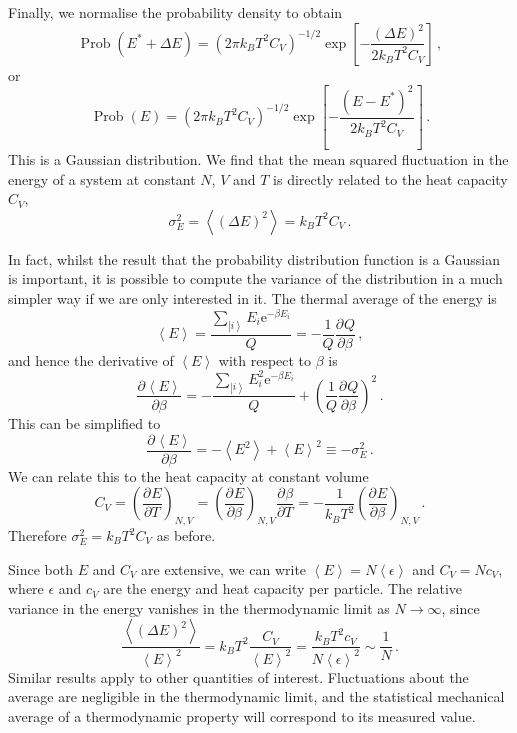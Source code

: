 \documentclass{article}
\theoremstyle{plain}\theoremheaderfont{\normalfont\bfseries}\theorembodyfont{\rmfamily}\theoremseparator{.}\newtheorem*{thm}{Theorem}\newtheorem*{law}{Law}\newtheorem*{pos}{Postulate}
\numberwithin{equation}{section}
\newcommand{\ee}{\mathrm{e}}
\newcommand{\pdv}[3][]{\frac{\partial^{#1} #2}{{\partial #3}^{#1}}}
\newcommand{\ket}[1]{\left| #1 \right\rangle}
\newcommand{\eval}[1]{\left\langle #1 \right\rangle}
\DeclareMathOperator{\Prob}{Prob}
\begin{document}
    Finally, we normalise the probability density to obtain
    \begin{equation}
        \Prob(E^*+\Delta E)=(2\pi k_B T^2 C_V)^{-1/2}\exp\left[-\frac{(\Delta E)^2}{2k_B T^2C_V}\right]\,,
    \end{equation}
    or
    \begin{equation}
        \Prob(E)=(2\pi k_B T^2 C_V)^{-1/2}\exp\left[-\frac{(E-E^*)^2}{2k_B T^2C_V}\right]\,.
    \end{equation}
    This is a Gaussian distribution. We find that the mean squared fluctuation in the energy of a system at constant \(N\), \(V\) and \(T\) is directly related to the heat capacity \(C_V\),
    \begin{equation}
        \sigma_E^2=\eval{(\Delta E)^2}=k_BT^2C_V\,.
    \end{equation}

    In fact, whilst the result that the probability distribution function is a Gaussian is important, it is possible to compute the variance of the distribution in a much simpler way if we are only interested in it. The thermal average of the energy is
    \begin{equation}
        \eval{E}=\frac{\sum_{\ket{i}}E_i \ee^{-\beta E_i}}{Q}=-\frac{1}{Q}\pdv{Q}{\beta}\,,
    \end{equation}
    and hence the derivative of \(\eval{E}\) with respect to \(\beta\) is
    \begin{equation}
        \pdv{\eval{E}}{\beta}=-\frac{\sum_{\ket{i}}E_i^2 \ee^{-\beta E_i}}{Q}+\left(\frac{1}{Q}\pdv{Q}{\beta}\right)^2\,.
    \end{equation}
    This can be simplified to
    \begin{equation}
        \pdv{\eval{E}}{\beta}=-\eval{E^2}+\eval{E}^2\equiv -\sigma_E^2\,.
    \end{equation}
    We can relate this to the heat capacity at constant volume
    \begin{equation}
        C_V=\left(\pdv{E}{T}\right)_{N,V}=\left(\pdv{E}{\beta}\right)_{N,V}\pdv{\beta}{T}=-\frac{1}{k_BT^2}\left(\pdv{E}{\beta}\right)_{N,V}\,.
    \end{equation}
    Therefore \(\sigma_E^2=k_BT^2 C_V\) as before.

    Since both \(E\) and \(C_V\) are extensive, we can write \(\eval{E}=N\eval{\epsilon}\) and \(C_V=Nc_V\), where \(\epsilon\) and \(c_V\) are the energy and heat capacity per particle. The relative variance in the energy vanishes in the thermodynamic limit as \(N\to\infty\), since
    \begin{equation}
        \frac{\eval{(\Delta E)^2}}{\eval{E}^2}=k_BT^2\frac{C_V}{\eval{E}^2}=\frac{k_BT^2c_V}{N\eval{\epsilon}^2}\sim\frac{1}{N}\,.
    \end{equation}
    Similar results apply to other quantities of interest. Fluctuations about the average are negligible in the thermodynamic limit, and the statistical mechanical average of a thermodynamic property will correspond to its measured value.
\end{document}
